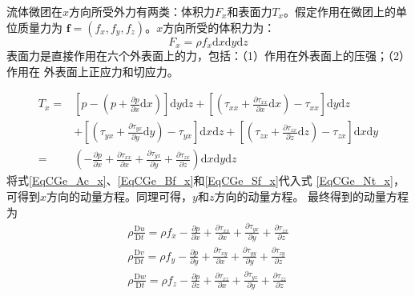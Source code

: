 流体微团在$x$方向所受外力有两类：体积力$F_{x}$和表面力$T_{x}$。假定作用在微团上的单位质量力为
$\mathbf{f}=(f_{x}, f_{y}, f_{z})$。$x$方向所受的体积力为：
\begin{equation}
  F_{x} = \rho f_{x}\mathrm{d}x\mathrm{d}y\mathrm{d}z
  \label{EqCGe_Bf_x}
\end{equation}
表面力是直接作用在六个外表面上的力，包括：（1）作用在外表面上的压强；（2）作用在
外表面上正应力和切应力。

\begin{equation}
  \begin{aligned}
    T_{x} =&
    \left[
      p -
      \left(
        p +
        \frac{\partial p}{\partial x}\mathrm{d}x
      \right)
    \right]\mathrm{d}y\mathrm{d}z
    +
    \left[
      \left(
        \tau_{xx} +
        \frac{\partial \tau_{xx}}{\partial x}\mathrm{d}x
      \right)
      - \tau_{xx}
    \right]\mathrm{d}y\mathrm{d}z \\
           & +
           \left[
             \left(
               \tau_{yx} +
               \frac{\partial \tau_{yx}}{\partial y}\mathrm{d}y
             \right)
             - \tau_{yx}
           \right]\mathrm{d}x\mathrm{d}z
           +
           \left[
             \left(
               \tau_{zx} +
               \frac{\partial \tau_{zx}}{\partial z}\mathrm{d}z
             \right)
             - \tau_{zx}
           \right]\mathrm{d}x\mathrm{d}y
           \\
    =&
    \left(
      -\frac{\partial p}{\partial x}
      +\frac{\partial \tau_{xx}}{\partial x}
      +\frac{\partial \tau_{yx}}{\partial y}
      +\frac{\partial \tau_{zx}}{\partial z}
    \right)
    \mathrm{d}x\mathrm{d}y\mathrm{d}z
  \end{aligned}
  \label{EqCGe_Sf_x}
\end{equation}
将式\eqref{EqCGe_Ac_x}、\eqref{EqCGe_Bf_x}和\eqref{EqCGe_Sf_x}代入式
\eqref{EqCGe_Nt_x}，可得到$x$方向的动量方程。同理可得，$y$和$z$方向的动量方程。
最终得到的动量方程为
\begin{equation}
  \begin{aligned}
    \rho \frac{\mathrm{D}u}{\mathrm{D}t} =
    \rho f_{x}
    -\frac{\partial p}{\partial x}
    +\frac{\partial \tau_{xx}}{\partial x}
    +\frac{\partial \tau_{yx}}{\partial y}
    +\frac{\partial \tau_{zx}}{\partial z}
    \\
    \rho \frac{\mathrm{D}v}{\mathrm{D}t} =
    \rho f_{y}
    -\frac{\partial p}{\partial y}
    +\frac{\partial \tau_{xy}}{\partial x}
    +\frac{\partial \tau_{yy}}{\partial y}
    +\frac{\partial \tau_{zy}}{\partial z}
    \\
    \rho \frac{\mathrm{D}w}{\mathrm{D}t} =
    \rho f_{z}
    -\frac{\partial p}{\partial z}
    +\frac{\partial \tau_{xz}}{\partial x}
    +\frac{\partial \tau_{yz}}{\partial y}
    +\frac{\partial \tau_{zz}}{\partial z}
  \end{aligned}
  \label{EqCGe_NS_Me_ori}
\end{equation}

